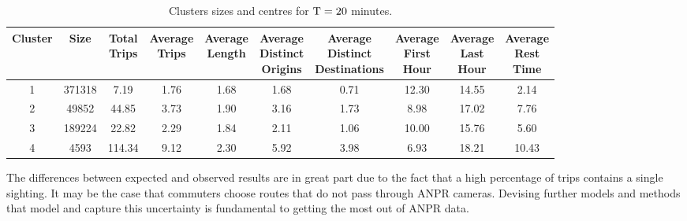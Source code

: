 \begin{table*}[t]
\centering
\small
\begin{tabular}{c c c c c c c c c c}
  \hline
 Cluster &  Size & \thead{Total\\Trips} & \thead{Average\\Trips} & \thead{Average\\Length} & \thead{Average\\Distinct\\Origins} & \thead{Average\\Distinct\\Destinations} & \thead{Average\\First\\Hour} & \thead{Average\\Last\\Hour} & \thead{Average\\Rest\\Time} \\
  \hline
  1 & 371318 & 7.19 & 1.76 & 1.68 & 1.68 & 0.71 & 12.30 & 14.55 & 2.14 \\
    2 & 49852 & 44.85 & 3.73 & 1.90 & 3.16 & 1.73 & 8.98 & 17.02 & 7.76 \\
    3 & 189224 & 22.82 & 2.29 & 1.84 & 2.11 & 1.06 & 10.00 & 15.76 & 5.60 \\
    4 & 4593 & 114.34 & 9.12 & 2.30 & 5.92 & 3.98 & 6.93 & 18.21 & 10.43 \\
   \hline
\end{tabular}
\caption{Clusters sizes and centres for $\mathrm{T} = 20$ minutes.}
\label{t:kmeans_centers_1200}
\end{table*}

The differences between expected and observed results are in great part due to the fact that a high percentage of trips contains a single sighting. It may be the case that commuters choose routes that do not pass through ANPR cameras. Devising further models and methods that model and capture this uncertainty is fundamental to getting the most out of ANPR data.
